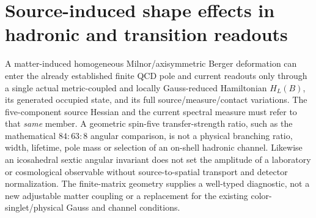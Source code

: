 \documentclass[12pt,a4paper]{article}
\begin{document}
\section{Source-induced shape effects in hadronic and transition readouts}
\label{bh:berger:v117:p7b:observable-gate}
\begin{remark}
\label{bh:berger:v117:p7b:spectral-gate}
A matter-induced homogeneous Milnor/axisymmetric Berger deformation
can enter the already established finite QCD pole and current readouts
only through a single actual metric-coupled and locally Gauss-reduced
Hamiltonian $H_L(B)$, its generated occupied state, and its full
source/measure/contact variations. The five-component source Hessian
and the current spectral measure must refer to that \emph{same} member.
A geometric spin-five transfer-strength ratio, such as the mathematical
$84{:}63{:}8$ angular comparison, is not a physical branching ratio,
width, lifetime, pole mass or selection of an on-shell hadronic channel.
Likewise an icosahedral sextic angular invariant does not set the
amplitude of a laboratory or cosmological observable without
source-to-spatial transport and detector normalization.
The finite-matrix geometry supplies a well-typed diagnostic, not a
new adjustable matter coupling or a replacement for the existing
color-singlet/physical Gauss and channel conditions.
\end{remark}



\end{document}

